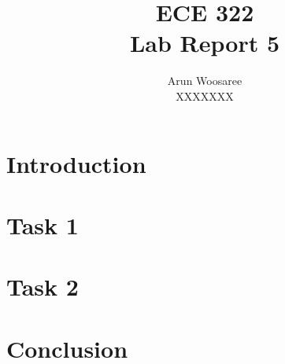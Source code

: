 \documentclass[letterpaper]{article}
\title{ECE 322 \\
Lab Report 5}
\author{Arun Woosaree\\
XXXXXXX}
\begin{document}
\maketitle

\section{Introduction}


\section{Task 1}



\section{Task 2}


\section{Conclusion}



\vfill
\appendix

%
%
%

%
%

\end{document}
